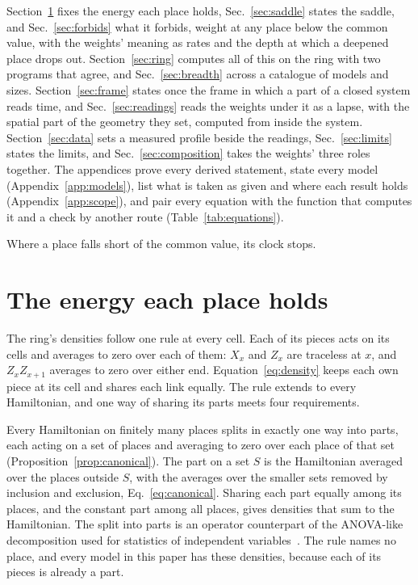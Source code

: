 \documentclass[aps,prd,reprint,superscriptaddress]{revtex4-2}
\begin{document}
Section~\ref{sec:division} fixes the energy each place holds, Sec.~\ref{sec:saddle} states the saddle, and Sec.~\ref{sec:forbids} what it forbids, weight at any place below the common value, with the weights' meaning as rates and the depth at which a deepened place drops out. Section~\ref{sec:ring} computes all of this on the ring with two programs that agree, and Sec.~\ref{sec:breadth} across a catalogue of models and sizes. Section~\ref{sec:frame} states once the frame in which a part of a closed system reads time, and Sec.~\ref{sec:readings} reads the weights under it as a lapse, with the spatial part of the geometry they set, computed from inside the system. Section~\ref{sec:data} sets a measured profile beside the readings, Sec.~\ref{sec:limits} states the limits, and Sec.~\ref{sec:composition} takes the weights' three roles together. The appendices prove every derived statement, state every model (Appendix~\ref{app:models}), list what is taken as given and where each result holds (Appendix~\ref{app:scope}), and pair every equation with the function that computes it and a check by another route (Table~\ref{tab:equations}).

Where a place falls short of the common value, its clock stops.

\section{The energy each place holds}
\label{sec:division}

The ring's densities follow one rule at every cell. Each of its pieces acts on its cells and averages to zero over each of them: $X_x$ and $Z_x$ are traceless at $x$, and $Z_xZ_{x+1}$ averages to zero over either end. Equation~\eqref{eq:density} keeps each own piece at its cell and shares each link equally. The rule extends to every Hamiltonian, and one way of sharing its parts meets four requirements.

Every Hamiltonian on finitely many places splits in exactly one way into parts, each acting on a set of places and averaging to zero over each place of that set (Proposition~\ref{prop:canonical}). The part on a set $S$ is the Hamiltonian averaged over the places outside $S$, with the averages over the smaller sets removed by inclusion and exclusion, Eq.~\eqref{eq:canonical}. Sharing each part equally among its places, and the constant part among all places, gives densities that sum to the Hamiltonian. The split into parts is an operator counterpart of the ANOVA-like decomposition used for statistics of independent variables~\cite{EfronStein1981}. The rule names no place, and every model in this paper has these densities, because each of its pieces is already a part.
\end{document}
